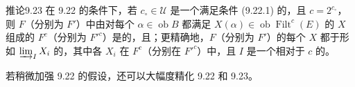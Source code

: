 \begin{SGAresult}{推论}{9.23}
在 9.22 的条件下，若 $c_\circ\in\mathcal U$ 是一个满足条件 (9.22.1) 的，且 $c=2^{c_\circ}$，则 $F$（分别为 $F'$）中由对每个 $\alpha\in\operatorname{ob}B$ 都满足 $X(\alpha)\in\operatorname{ob}\operatorname{Filt}^c(E)$ 的 $X$ 组成的 $F^c$（分别为 $F'^c$）是的，且；更精确地，$F$（分别为 $F'$）的每个 $X$ 都于形如 $\varinjlim_I X_i$ 的，其中各 $X_i$ 在 $F^c$（分别在 $F'^c$）中，且 $I$ 是一个相对于 $c$  的。
\end{SGAresult}

若稍微加强 9.22 的假设，还可以大幅度精化 9.22 和 9.23。

